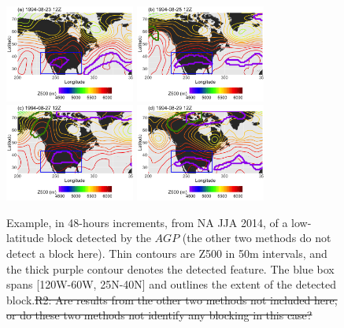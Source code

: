 \documentclass[smallextended]{svjour3}       %
\numberwithin{equation}{section}
\begin{document}
\begin{figure}
\centering
\includegraphics[width=0.38\textwidth]{fig10a}
\includegraphics[width=0.38\textwidth]{fig10b}\\
\includegraphics[width=0.38\textwidth]{fig10c}
\includegraphics[width=0.38\textwidth]{fig10d}
\caption{Example, in 48-hours increments, from NA JJA 2014, of a low-latitude block detected by the $AGP$ (the other two methods do not detect a block here). Thin contours are Z500 in 50m intervals, and the thick purple contour denotes the detected feature. The blue box spans [120W-60W, 25N-40N] and outlines the extent of the detected block.{\color{teal}\sout{R2: Are results from the other two methods not included here, or do these two methods not identify any blocking in this case?}}}\label{lowlatjja}
\end{figure} 
\end{document}
